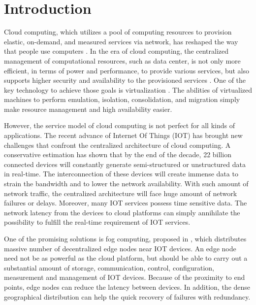 \chapter{Introduction}
\label{chap:intro}
Cloud computing, which utilizes a pool of computing resources to provision elastic, on-demand, and measured services via network, has reshaped the way that people use computers \cite{armbrust2010view}.  In the era of cloud computing, the centralized management of computational resources, such as data center, is not only more efficient, in terms of power and performance, to provide various services, but also supports higher security and availability to the provisioned services \cite{cully2008remus,gray1991high}.  One of the key technology to achieve those goals is virtualization \cite{goldberg1974survey, miller2007virtualization, yan2011development, singh2008server, chowdhury2010survey}. The abilities of virtualized machines to perform emulation, isolation, consolidation, and migration simply make resource management and high availability easier.

However, the service model of cloud computing is not perfect for all kinds of applications.  The recent advance of Internet Of Things (IOT) has brought new challenges that confront the centralized architecture of cloud computing.  A conservative estimation has shown that by the end of the decade, 22 billion connected devices will constantly generate semi-structured or unstructured data in real-time.  The interconnection of these devices will create immense data to strain the bandwidth and to lower the network availability. With such amount of network traffic, the centralized architecture will face huge amount of network failures or delays.  Moreover, many IOT services possess time sensitive data.  The network latency from the devices to cloud platforms can simply annihilate the possibility to fulfill the real-time requirement of IOT services.

One of the promising solutions is fog computing, proposed in {\color{red}\cite{bonomi2012fog,stolfo2012fog}}, which distributes massive number of decentralized edge nodes near IOT devices.  An edge node need not be as powerful as the cloud platform, but should be able to carry out a substantial amount of storage, communication, control, configuration, measurement and management of IOT devices.  Because of the proximity to end points, edge nodes can reduce the latency between devices.  In addition, the dense geographical distribution can help the quick recovery of failures with redundancy.

